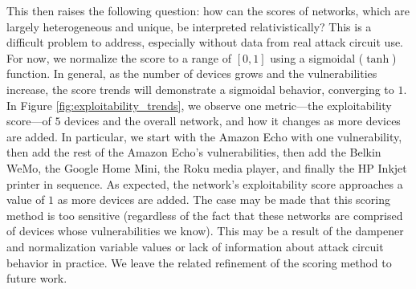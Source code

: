 This then raises the following question: how can the scores of networks, which are largely heterogeneous and unique, be interpreted relativistically? This is a difficult problem to address, especially without data from real attack circuit use. For now, we normalize the score to a range of $[0,1]$ using a sigmoidal ($\tanh$) function. In general, as the number of devices grows and the vulnerabilities increase, the score trends will demonstrate a sigmoidal behavior, converging to $1$. In Figure \ref{fig:exploitability_trends}, we observe one metric---the exploitability score---of $5$ devices and the overall network, and how it changes as more devices are added. In particular, we start with the Amazon Echo with one vulnerability, then add the rest of the Amazon Echo's vulnerabilities, then add the Belkin WeMo, the Google Home Mini, the Roku media player, and finally the HP Inkjet printer in sequence. As expected, the network's exploitability score approaches a value of $1$ as more devices are added. The case may be made that this scoring method is too sensitive (regardless of the fact that these networks are comprised of devices whose vulnerabilities we know). This may be a result of the dampener and normalization variable values or lack of information about attack circuit behavior in practice. We leave the related refinement of the scoring method to future work.




